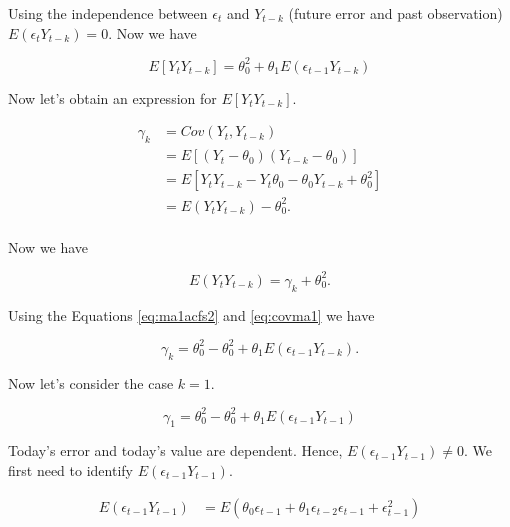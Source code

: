 \documentclass[]{book}
\begin{document}
Using the independence between \(\epsilon_t\) and \(Y_{t-k}\) (future error and past observation) \(E(\epsilon_t Y_{t-k}) = 0\). Now we have

\begin{equation}
\label{eq:ma1acfs2}
E[Y_tY_{t-k}] = \theta_0^2  + \theta_1 E(\epsilon_{t-1}Y_{t-k}) 
\end{equation}

Now let's obtain an expression for \(E[Y_t Y_{t-k}]\).

\begin{equation}
  \label{eq:covma1}
\begin{aligned}
  \gamma_k &= Cov(Y_t, Y_{t-k}) \\
         &= E[(Y_t-\theta_0)(Y_{t-k}-\theta_0)] \\
         &= E[Y_tY_{t-k}-Y_t\theta_0-\theta_0 Y_{t-k} +\theta_0^2] \\
         &= E(Y_t Y_{t-k}) - \theta_0^2. \\
\end{aligned}
\end{equation}

Now we have

\begin{equation}
  \label{eq:covma1}
  E(Y_t Y_{t-k}) = \gamma_k + \theta_0^2.
\end{equation}

Using the Equations \eqref{eq:ma1acfs2} and \eqref{eq:covma1} we have

\begin{equation}
  \label{eq:covma2}
  \gamma_k = \theta_0^2 - \theta_0^2 + \theta_1E(\epsilon_{t-1}Y_{t-k}).
\end{equation}

Now let's consider the case \(k=1\).

\begin{equation}
  \label{eq:covma3}
  \gamma_1 = \theta_0^2 - \theta_0^2 + \theta_1E(\epsilon_{t-1}Y_{t-1})
\end{equation}

Today's error and today's value are dependent. Hence, \(E(\epsilon_{t-1}Y_{t-1}) \neq 0.\) We first need to identify \(E(\epsilon_{t-1}Y_{t-1})\).

\begin{equation}
  \label{eq:covma4}
\begin{aligned}
E(\epsilon_{t-1}Y_{t-1}) &= E(\theta_0 \epsilon_{t-1} + \theta_1 \epsilon_{t-2} \epsilon_{t-1}+ \epsilon_{t-1}^2)\\
\end{aligned}
\end{equation}
\end{document}
